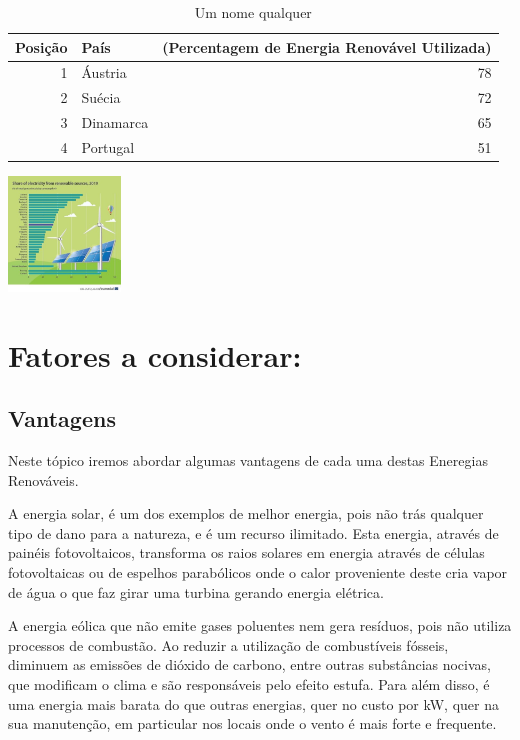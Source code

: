 \documentclass{report}
\begin{document}
\begin{table}[h]
\centering
\caption{Um nome qualquer}
\vspace{0.5cm}
\begin{tabular}{r|lr}

Posi{\c c}{\~a}o & Pa{\'i}s & (Percentagem de Energia Renovável Utilizada) \\ 
\hline                              
1 & Áustria        & 78 \\
2 & Suécia   & 72 \\
3 & Dinamarca            & 65 \\
4 & Portugal        & 51 \\
           

\end{tabular}
\end{table}

\includegraphics[width = 3cm]{Image.jpg}
\clearpage





\section{Fatores a considerar:}

\subsection{Vantagens}
Neste tópico iremos abordar algumas vantagens de cada uma destas Eneregias Renováveis.

A energia solar, é um dos exemplos de melhor energia, pois não trás qualquer tipo de dano para a natureza, e é um recurso ilimitado. Esta energia, através de painéis fotovoltaicos, transforma os raios solares em energia através de células fotovoltaicas ou de espelhos parabólicos onde o calor proveniente deste cria vapor de água o que faz girar uma turbina gerando energia elétrica. 


A energia eólica que não emite gases poluentes nem gera resíduos, pois não utiliza processos de combustão. Ao reduzir a utilização de combustíveis fósseis, diminuem as emissões de dióxido de carbono, entre outras substâncias nocivas, que modificam o clima e são responsáveis pelo efeito estufa. Para além disso, é uma energia mais barata do que outras energias, quer no custo por kW, quer na sua manutenção, em particular nos locais onde o vento é mais forte e frequente. 
\end{document}
